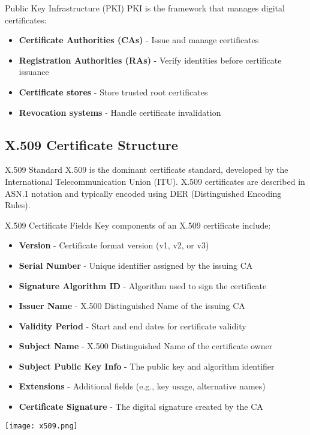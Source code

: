 \begin{concept}{Public Key Infrastructure (PKI)}
PKI is the framework that manages digital certificates:
\begin{itemize}
    \item \textbf{Certificate Authorities (CAs)} - Issue and manage certificates
    \item \textbf{Registration Authorities (RAs)} - Verify identities before certificate issuance
    \item \textbf{Certificate stores} - Store trusted root certificates
    \item \textbf{Revocation systems} - Handle certificate invalidation
\end{itemize}
\end{concept}


\subsection{X.509 Certificate Structure}

\begin{definition}{X.509 Standard}
X.509 is the dominant certificate standard, developed by the International Telecommunication Union (ITU). X.509 certificates are described in ASN.1 notation and typically encoded using DER (Distinguished Encoding Rules).
\end{definition}

\begin{concept}{X.509 Certificate Fields}
Key components of an X.509 certificate include:
\begin{itemize}
    \item \textbf{Version} - Certificate format version (v1, v2, or v3)
    \item \textbf{Serial Number} - Unique identifier assigned by the issuing CA
    \item \textbf{Signature Algorithm ID} - Algorithm used to sign the certificate
    \item \textbf{Issuer Name} - X.500 Distinguished Name of the issuing CA
    \item \textbf{Validity Period} - Start and end dates for certificate validity
    \item \textbf{Subject Name} - X.500 Distinguished Name of the certificate owner
    \item \textbf{Subject Public Key Info} - The public key and algorithm identifier
    \item \textbf{Extensions} - Additional fields (e.g., key usage, alternative names)
    \item \textbf{Certificate Signature} - The digital signature created by the CA
\end{itemize}
\texttt{[image: x509.png]}
\end{concept}

